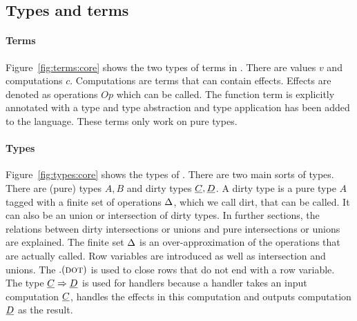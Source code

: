 \subsection{Types and terms}

\paragraph{Terms}
Figure~\ref{fig:terms:core} shows the two types of terms in \core. There are values $v$ and computations $c$. Computations are terms that can contain effects. Effects are denoted as operations $Op$ which can be called. The function term is explicitly annotated with a type and type abstraction and type application has been added to the language. These terms only work on pure types.

\paragraph{Types}
Figure~\ref{fig:types:core} shows the types of \core. There are two main sorts of types. There are (pure) types $A, B$ and dirty types $\underline{C}, \underline{D}$. A dirty type is a pure type $A$ tagged with a finite set of operations $\Delta$, which we call dirt, that can be called. It can also be an union or intersection of dirty types. In further sections, the relations between dirty intersections or unions and pure intersections or unions are explained. The finite set $\Delta$ is an over-approximation of the operations that are actually called. Row variables are introduced as well as intersection and unions. The $. (\textsc{dot})$ is used to close rows that do not end with a row variable. The type $\underline{C} \Rightarrow \underline{D}$ is used for handlers because a handler takes an input computation $\underline{C}$, handles the effects in this computation and outputs computation $\underline{D}$ as the result.

